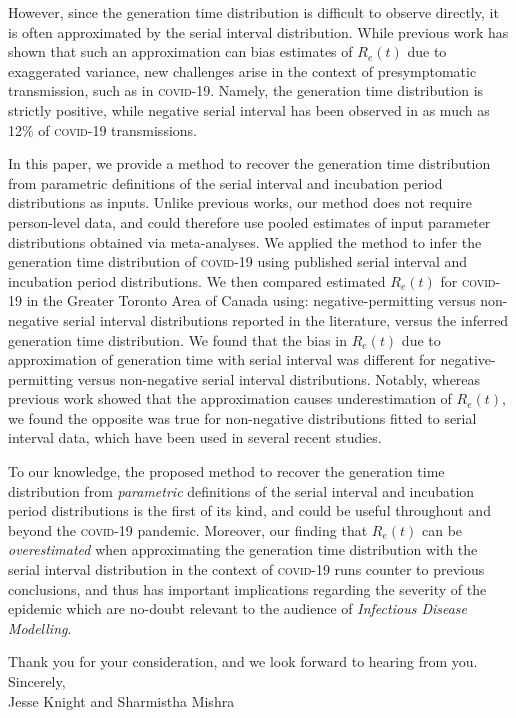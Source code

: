\documentclass{article}
\newcommand{\covid}{\textsc{covid-19}\xspace}
\begin{document}
However, since the generation time distribution is difficult to observe directly,
it is often approximated by the serial interval distribution.
While previous work has shown that such an approximation
can bias estimates of $R_e(t)$ due to exaggerated variance,
new challenges arise in the context of presymptomatic transmission, such as in \covid.
Namely, the generation time distribution is strictly positive,
while negative serial interval has been observed in
as much as 12\% of \covid transmissions.
\par
In this paper, we provide a method to recover the generation time distribution from
parametric definitions of the serial interval and incubation period distributions as inputs.
Unlike previous works, our method does not require person-level data, and could therefore use
pooled estimates of input parameter distributions obtained via meta-analyses.
We applied the method to infer the generation time distribution of \covid
using published serial interval and incubation period distributions.
We then compared estimated $R_e(t)$ for \covid in the Greater Toronto Area of Canada using:
negative-permitting versus non-negative serial interval distributions reported in the literature,
versus the inferred generation time distribution.
We found that the bias in $R_e(t)$ due to approximation of generation time with serial interval
was different for negative-permitting versus non-negative serial interval distributions.
Notably, whereas previous work showed that the approximation causes underestimation of $R_e(t)$,
we found the opposite was true for non-negative distributions fitted to serial interval data,
which have been used in several recent studies.
\par
To our knowledge, the proposed method to recover the generation time distribution
from \emph{parametric} definitions of the serial interval and incubation period distributions
is the first of its kind, and could be useful throughout and beyond the \covid pandemic.
Moreover, our finding that $R_e(t)$ can be \emph{overestimated} when approximating
the generation time distribution with the serial interval distribution in the context of \covid
runs counter to previous conclusions,
and thus has important implications regarding the severity of the epidemic
which are no-doubt relevant to the audience of \textit{Infectious Disease Modelling}.
\par
Thank you for your consideration, and we look forward to hearing from you.
\\[2ex]
Sincerely,\\[1ex]
Jesse Knight and Sharmistha Mishra
\end{document}
